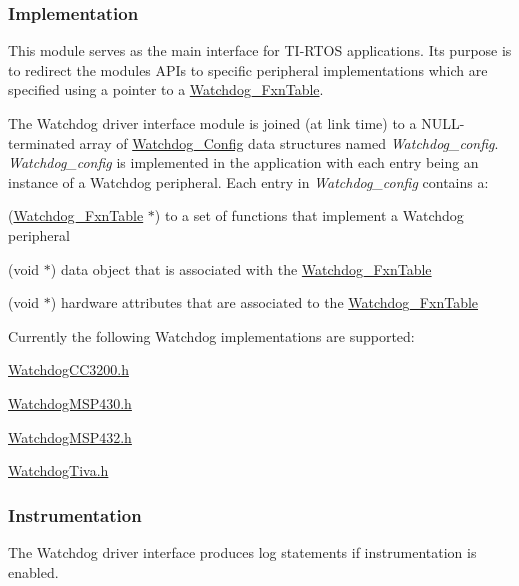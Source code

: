 \subsubsection*{Implementation}

This module serves as the main interface for T\+I-\/\+R\+T\+O\+S applications. Its purpose is to redirect the module\textquotesingle{}s A\+P\+Is to specific peripheral implementations which are specified using a pointer to a \hyperlink{struct_watchdog___fxn_table}{Watchdog\+\_\+\+Fxn\+Table}.

The Watchdog driver interface module is joined (at link time) to a N\+U\+L\+L-\/terminated array of \hyperlink{struct_watchdog___config}{Watchdog\+\_\+\+Config} data structures named {\itshape Watchdog\+\_\+config}. {\itshape Watchdog\+\_\+config} is implemented in the application with each entry being an instance of a Watchdog peripheral. Each entry in {\itshape Watchdog\+\_\+config} contains a\+:
\begin{DoxyItemize}
\item (\hyperlink{struct_watchdog___fxn_table}{Watchdog\+\_\+\+Fxn\+Table} $\ast$) to a set of functions that implement a Watchdog peripheral
\item (void $\ast$) data object that is associated with the \hyperlink{struct_watchdog___fxn_table}{Watchdog\+\_\+\+Fxn\+Table}
\item (void $\ast$) hardware attributes that are associated to the \hyperlink{struct_watchdog___fxn_table}{Watchdog\+\_\+\+Fxn\+Table}
\end{DoxyItemize}

Currently the following Watchdog implementations are supported\+:
\begin{DoxyItemize}
\item \hyperlink{_watchdog_c_c3200_8h}{Watchdog\+C\+C3200.\+h}
\item \hyperlink{_watchdog_m_s_p430_8h}{Watchdog\+M\+S\+P430.\+h}
\item \hyperlink{_watchdog_m_s_p432_8h}{Watchdog\+M\+S\+P432.\+h}
\item \hyperlink{_watchdog_tiva_8h}{Watchdog\+Tiva.\+h}
\end{DoxyItemize}

\subsubsection*{Instrumentation}

The Watchdog driver interface produces log statements if instrumentation is enabled.

